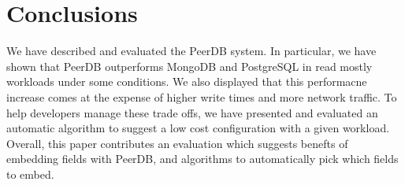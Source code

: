 \section{Conclusions}
We have described and evaluated the PeerDB system. 
In particular, we have shown that PeerDB outperforms MongoDB and PostgreSQL in read mostly workloads under some conditions. 
We also displayed that this performacne increase comes at the expense of higher write times and more network traffic. 
To help developers manage these trade offs, we have presented and evaluated an automatic algorithm to suggest a low cost configuration with a given workload.
Overall, this paper contributes an evaluation which suggests benefts of embedding fields with PeerDB, and algorithms to automatically pick which fields to embed. 